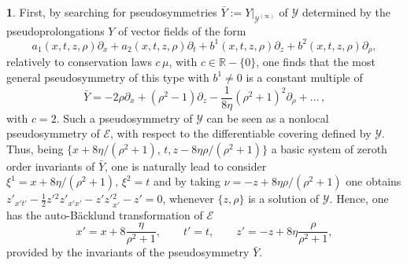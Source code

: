 \documentclass[12pt,english]{elsarticle}
\theoremstyle{plain}
\theoremstyle{plain}
\theoremstyle{remark}
\theoremstyle{plain}
\theoremstyle{definition}
\theoremstyle{definition}
\newtheorem{example}[thm]{\protect\examplename}
\providecommand{\examplename}{Example}
\begin{document}
\begin{example}
First, by searching for pseudosymmetries
$\bar{Y}:=\left .Y\right |_{\mathcal{Y}^{(\infty )}}$ of
$\mathcal{Y}$ determined by the pseudoprolongations $Y$ of vector fields
of the form
%
\begin{equation*}
a_{1}(x,t,z,\rho )\partial _{x}+a_{2}(x,t,z,\rho )\partial _{t}+b^{1}(x,t,z,
\rho )\partial _{z}+b^{2}(x,t,z,\rho )\partial _{\rho},
\end{equation*}
%
relatively to conservation laws $c\,\mu $, with
$c\in \mathbb{R}-\{0\}$, one finds that the most general pseudosymmetry
of this type with $b^{1}\neq 0$ is a constant multiple of
%
\begin{equation*}
\bar{Y}=-2\rho \partial _{x}+\left (\rho ^{2}-1\right )\partial _{z}-
\frac{1}{8\eta}\left (\rho ^{2}+1\right )^{2}\partial _{\rho}+\ldots
\,,
\end{equation*}
%
with $c=2$. Such a pseudosymmetry of $\mathcal{Y}$ can be seen as a nonlocal
pseudosymmetry of $\mathcal{E}$, with respect to the differentiable covering
defined by $\mathcal{Y}$. Thus, being
$\{x+8\eta /(\rho ^{2}+1),\,t,z-8\eta \rho /(\rho ^{2}+1)\}$ a basic system
of zeroth order invariants of $\bar{Y}$, one is naturally lead to consider
$\xi ^{1}=x+8\eta /(\rho ^{2}+1),\,\xi ^{2}=t$ and by taking
$\nu =-z+8\eta \rho /(\rho ^{2}+1)$ one obtains
$z'_{x't'}-\frac{1}{2}z'{}^{2}z'_{x'x'}-z'z'{}_{x'}^{2}-z'=0$, whenever
$\{z,\rho \}$ is a solution of $\mathcal{Y}$. Hence, one has the auto-B\"{a}cklund
transformation of $\mathcal{E}$
%
\begin{equation*}
x'=x+8\frac{\eta}{\rho ^{2}+1},\qquad t'=t,\qquad z'=-z+8\eta
\frac{\rho}{\rho ^{2}+1},
\end{equation*}
%
provided by the invariants of the pseudosymmetry $\bar{Y}$.
\end{example}
\end{document}
